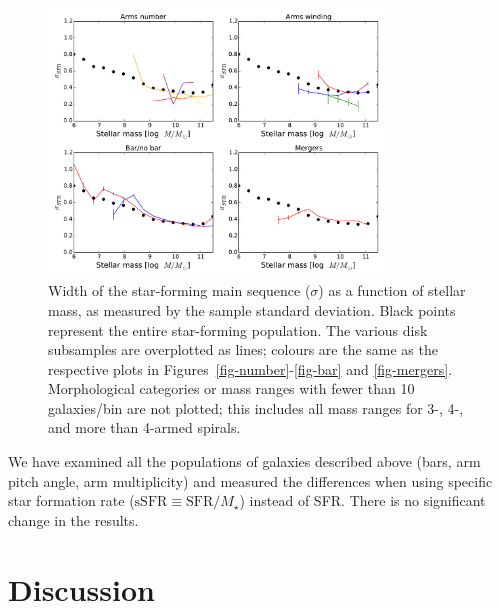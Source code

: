 \documentclass{emulateapj}
\begin{document}
\begin{figure}
\includegraphics[angle=0,width=3.5in]{figures/sigma_mstar.pdf}
\caption{Width of the star-forming main sequence ($\sigma$) as a function of stellar mass, as measured by the sample standard deviation. Black points represent the entire star-forming population. The various disk subsamples are overplotted as lines; colours are the same as the respective plots in Figures~\ref{fig-number}-\ref{fig-bar} and \ref{fig-mergers}. Morphological categories or mass ranges with fewer than 10 galaxies/bin are not plotted; this includes all mass ranges for 3-, 4-, and more than 4-armed spirals.
\label{fig-sigma}}
\end{figure}

We have examined all the populations of galaxies described above (bars, arm pitch angle, arm multiplicity) and measured the differences when using specific star formation rate ($\textrm{sSFR}\equiv\textrm{SFR}/M_\star$) instead of SFR. There is no significant change in the results. 


\section{Discussion}\label{sec-discussion}
\end{document}
